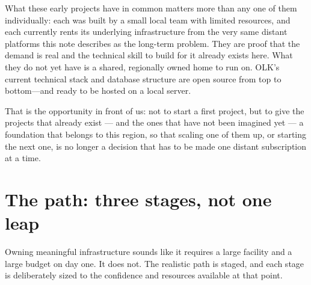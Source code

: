 \documentclass[12pt]{article}
\begin{document}
\begin{vision}
	What these early projects have in common matters more than any one of them individually: each was built by a small local team with limited resources, and each currently rents its underlying infrastructure from the very same distant platforms this note describes as the long-term problem. They are proof that the demand is real and the technical skill to build for it already exists here. What they do not yet have is a shared, regionally owned home to run on. OLK's current technical stack and database structure are open source from top to bottom—and ready to be hosted on a local server.\footnotemark
\end{vision}
That is the opportunity in front of us: not to start a first project, but to give
the projects that already exist --- and the ones that have not been imagined yet
--- a foundation that belongs to this region, so that scaling one of them up, or
starting the next one, is no longer a decision that has to be made one distant
subscription at a time.

\section{The path: three stages, not one leap}

Owning meaningful infrastructure sounds like it requires a large facility and a
large budget on day one. It does not. The realistic path is staged, and each
stage is deliberately sized to the confidence and resources available at that
point.

\begin{center}
\end{center}
\end{document}
